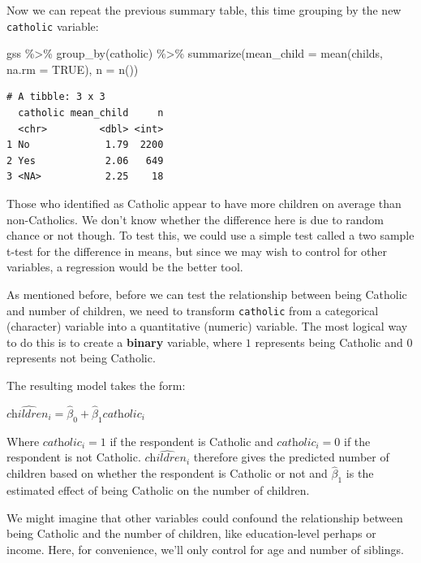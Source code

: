\documentclass[
  letterpaper,
]{book}
\newenvironment{Shaded}{\begin{snugshade}}{\end{snugshade}}
\newcommand{\AttributeTok}[1]{\textcolor[rgb]{0.40,0.45,0.13}{#1}}
\newcommand{\ConstantTok}[1]{\textcolor[rgb]{0.56,0.35,0.01}{#1}}
\newcommand{\FunctionTok}[1]{\textcolor[rgb]{0.28,0.35,0.67}{#1}}
\newcommand{\NormalTok}[1]{\textcolor[rgb]{0.00,0.23,0.31}{#1}}
\newcommand{\SpecialCharTok}[1]{\textcolor[rgb]{0.37,0.37,0.37}{#1}}
\begin{document}
Now we can repeat the previous summary table, this time grouping by the
new \texttt{catholic} variable:

\begin{Shaded}
\begin{Highlighting}[]
\NormalTok{gss }\SpecialCharTok{\%\textgreater{}\%}
  \FunctionTok{group\_by}\NormalTok{(catholic) }\SpecialCharTok{\%\textgreater{}\%}
  \FunctionTok{summarize}\NormalTok{(}\AttributeTok{mean\_child =} \FunctionTok{mean}\NormalTok{(childs, }\AttributeTok{na.rm =} \ConstantTok{TRUE}\NormalTok{),}
            \AttributeTok{n =} \FunctionTok{n}\NormalTok{())}
\end{Highlighting}
\end{Shaded}

\begin{verbatim}
# A tibble: 3 x 3
  catholic mean_child     n
  <chr>         <dbl> <int>
1 No             1.79  2200
2 Yes            2.06   649
3 <NA>           2.25    18
\end{verbatim}

Those who identified as Catholic appear to have more children on average
than non-Catholics. We don't know whether the difference here is due to
random chance or not though. To test this, we could use a simple test
called a two sample t-test for the difference in means, but since we may
wish to control for other variables, a regression would be the better
tool.

As mentioned before, before we can test the relationship between being
Catholic and number of children, we need to transform \texttt{catholic}
from a categorical (character) variable into a quantitative (numeric)
variable. The most logical way to do this is to create a \textbf{binary}
variable, where \(1\) represents being Catholic and \(0\) represents not
being Catholic.

The resulting model takes the form:

\(\widehat{\textit{children}_{i}}=\hat{\beta}_{0}+\hat{\beta}_{1}\textit{catholic}_{i}\)

Where \(\textit{catholic}_{i}= 1\) if the respondent is Catholic and
\(\textit{catholic}_{i}=0\) if the respondent is not Catholic.
\(\widehat{\textit{children}_{i}}\) therefore gives the predicted number
of children based on whether the respondent is Catholic or not and
\(\hat{\beta}_{1}\) is the estimated effect of being Catholic on the
number of children.

We might imagine that other variables could confound the relationship
between being Catholic and the number of children, like education-level
perhaps or income. Here, for convenience, we'll only control for age and
number of siblings.
\end{document}
